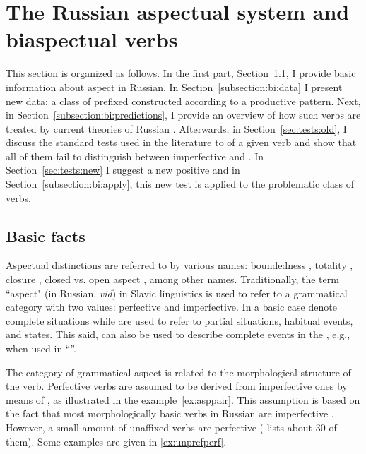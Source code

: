 \section{The Russian aspectual system and biaspectual verbs}\label{section:new:biaspectual}
This section is organized as follows. In the first part, Section~\ref{subsection:basic}, I provide basic information about aspect in Russian.  In Section~\ref{subsection:bi:data} I present new data: a class of prefixed  constructed according to a productive pattern. Next, in Section~\ref{subsection:bi:predictions}, I provide an overview of how such verbs are treated by current theories of Russian . Afterwards, in Section~\ref{sec:tests:old}, I discuss the standard tests used in the literature to  of a given verb and show that all of them fail to distinguish between imperfective and . In Section~\ref{sec:tests:new} I suggest a new positive  and in Section~\ref{subsection:bi:apply}, this new test is applied to the problematic class of verbs.

\subsection{Basic facts}\label{subsection:basic}
Aspectual distinctions  are referred to by various names: boundedness \citep{Avilova:76, Jakobson:57, Paducheva:96, Talmy:00}, totality \citep{Forsyth:70, Bondarko:71, Comrie:76, Dickey:00, Maslov:65}, closure \citep{Timberlake:82}, closed vs. open aspect \citep{Janda:07a}, among other names. Traditionally, the term ``aspect" (in Russian, \textit{vid}) in Slavic linguistics is used to refer to a grammatical category with two values: perfective and imperfective. In a basic case  denote complete situations while  are used to refer to partial situations, habitual events, and states. This said,  can also be used to describe complete events in the , e.g., when used in ``''. 

The category of grammatical aspect is related to the morphological structure of the verb. Perfective verbs are assumed to be derived from imperfective ones by means of , as illustrated in the example~\ref{ex:asppair}. This assumption is based on the fact that most morphologically basic verbs in Russian are imperfective \citep[see, e.g.,][]{Isachenko:60, Forsyth:70}. However, a small amount of unaffixed verbs are perfective (\citealt{Isachenko:60} lists about 30 of them). Some examples are given in \ref{ex:unprefperf}.

